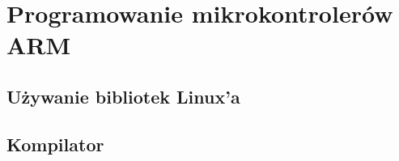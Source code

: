 \chapter{Programowanie mikrokontrolerów ARM}

\section{Używanie bibliotek Linux'a}

\section{Kompilator}
